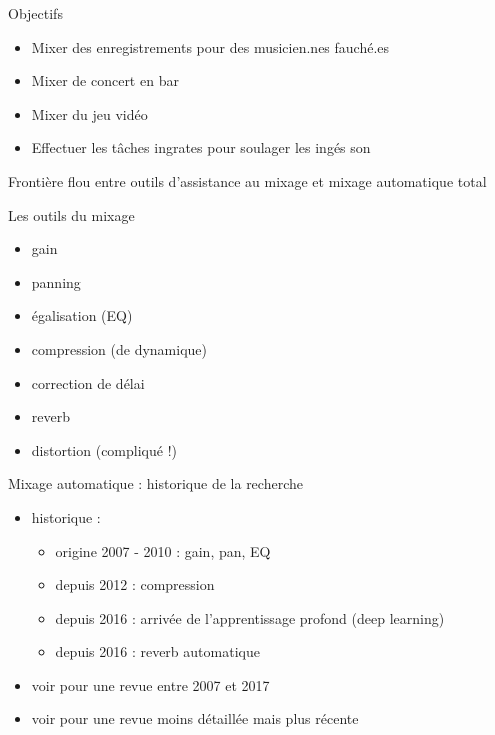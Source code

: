 \documentclass[9pt, aspectratio=169]{beamer}
\begin{document}
\begin{frame}{Objectifs} %
\pause
\begin{itemize}
	\item Mixer des enregistrements pour des musicien.nes fauché.es
	\item Mixer de concert en bar
	\item Mixer du jeu vidéo \cite{schmidt_interactive_2003}
	\item Effectuer les tâches ingrates pour soulager les ingés son
\end{itemize}

Frontière flou entre outils d'assistance au mixage et mixage automatique total

\end{frame}


\begin{frame}{Les outils du mixage} %

\begin{itemize}
	\item gain
	\item panning
	\item égalisation (EQ)
	\item compression (de dynamique)
	\item correction de délai
	\item reverb
	\item distortion (compliqué !)
\end{itemize}

\end{frame}

\begin{frame}{Mixage automatique : historique de la recherche} %

\begin{itemize}
\item historique :
\begin{itemize}
	\item origine 2007 - 2010 : gain, pan, EQ
	\item depuis 2012 : compression
	\item depuis 2016 : arrivée de l'apprentissage profond (deep learning)
	\item depuis 2016 : reverb automatique
\end{itemize}

\item voir \cite{de_man_ten_2017} pour une revue entre 2007 et 2017

\item voir \cite{miranda_handbook_2021} pour une revue moins détaillée mais plus récente
\end{itemize}
\end{frame}
\end{document}
